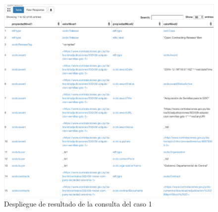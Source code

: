 \begin{figure}[ht!]
    \centering
    \includegraphics[width=150mm]{figuras/caso1Resultado.png}
    \caption{Despliegue de resultado de la consulta del caso 1}
    \label{img:caso1Resultado}
 \end{figure}
